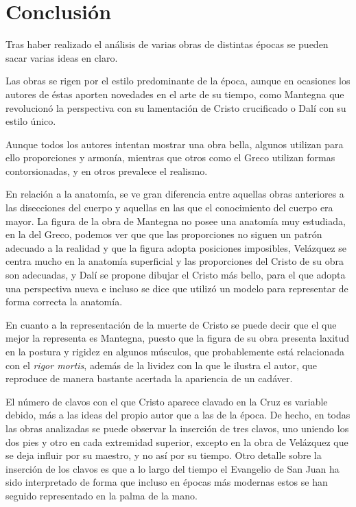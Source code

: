 \section{Conclusión}
Tras haber realizado el análisis de varias obras de distintas épocas se pueden sacar varias ideas en claro.

Las obras se rigen por el estilo predominante de la época, aunque en ocasiones los autores de éstas aporten novedades en el arte de su tiempo, como Mantegna que revolucionó la perspectiva con su lamentación de Cristo crucificado o Dalí con su estilo único.

Aunque todos los autores intentan mostrar una obra bella, algunos utilizan para ello proporciones y armonía, mientras que otros como el Greco utilizan formas contorsionadas, y en otros prevalece el realismo.

En relación a la anatomía, se ve gran diferencia entre aquellas obras anteriores a las disecciones del cuerpo y aquellas en las que el conocimiento del cuerpo era mayor. La figura de la obra de Mantegna no posee una anatomía muy estudiada, en la del Greco, podemos ver que que las proporciones no siguen un patrón adecuado a la realidad y que la figura adopta posiciones imposibles, Velázquez se centra mucho en la anatomía superficial y las proporciones del Cristo de su obra son adecuadas, y Dalí se propone dibujar el Cristo más bello, para el que adopta una perspectiva nueva e incluso se dice que utilizó un modelo para representar de forma correcta la anatomía.

En cuanto a la representación de la muerte de Cristo se puede decir que el que mejor la representa es Mantegna, puesto que la figura de su obra presenta laxitud en la postura y rigidez en algunos músculos, que probablemente está relacionada con el \textit{rigor mortis}, además de la lividez con la que le ilustra el autor, que reproduce de manera bastante acertada la apariencia de un cadáver.

El número de clavos con el que Cristo aparece clavado en la Cruz es variable debido, más a las ideas del propio autor que a las de la época. De hecho, en todas las obras analizadas se puede observar la inserción de tres clavos, uno uniendo los dos pies y otro en cada extremidad superior, excepto en la obra de Velázquez que se deja influir por su maestro, y no así por su tiempo. Otro detalle sobre la inserción de los clavos es que a lo largo del tiempo el Evangelio de San Juan ha sido interpretado de forma que incluso en épocas más modernas estos se han seguido representado en la palma de la mano.